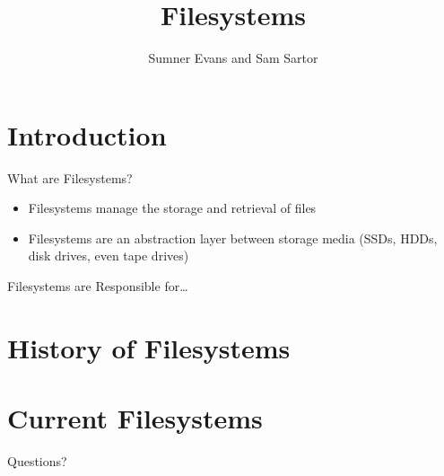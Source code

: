 \documentclass{lug}
\title{Filesystems}
\author{Sumner Evans and Sam Sartor}
\institute{Mines Linux Users Group}
\begin{document}
\section{Introduction}

\begin{frame}{What are Filesystems?}
    \begin{itemize}
        \item Filesystems manage the storage and retrieval of files
        \item Filesystems are an abstraction layer between storage media (SSDs,
            HDDs, disk drives, even tape drives)
    \end{itemize}
\end{frame}

\begin{frame}{Filesystems are Responsible for\ldots}
\end{frame}

\section{History of Filesystems}

\section{Current Filesystems}

\begin{frame}[standout]
    \Huge
    Questions?
\end{frame}
\end{document}
